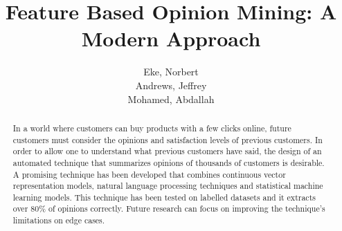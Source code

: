 \documentclass{sig-alternate}
\begin{document}
\title{Feature Based Opinion Mining: A Modern Approach}

\author{
\alignauthor
Eke, Norbert\\
\alignauthor Andrews, Jeffrey\\
\alignauthor Mohamed, Abdallah\\
}



\maketitle
\begin{abstract}
In a world where customers can buy products with a few clicks online, future customers must consider the opinions and satisfaction levels of previous customers. In order to allow one to understand what previous customers have said, the design of an automated technique that summarizes opinions of thousands of customers is desirable. A promising technique has been developed that combines continuous vector representation models, natural language processing techniques and statistical machine learning models. This technique has been tested on labelled datasets and it extracts over 80\% of opinions correctly. Future research can focus on improving the technique's limitations on edge cases.
\end{abstract}

\end{document}
